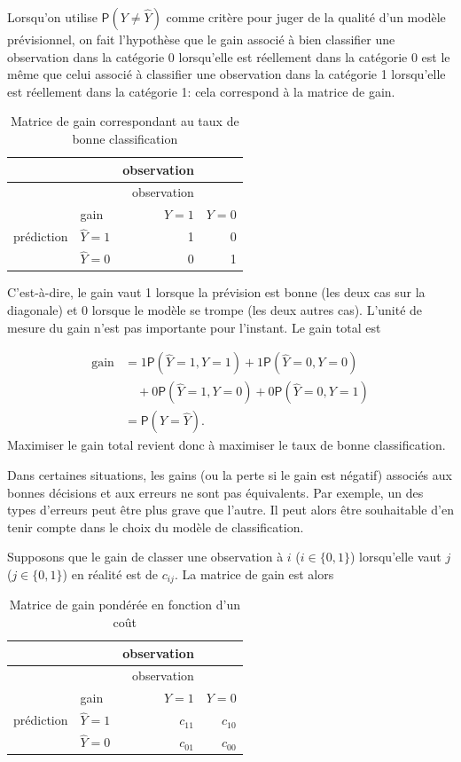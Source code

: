 \documentclass[
  11pt,
  letterpaper,
]{book}
\theoremstyle{definition}
\theoremstyle{definition}
\theoremstyle{definition}
\theoremstyle{remark}
\begin{document}
Lorsqu'on utilise \({\mathsf P}\left(Y \neq \widehat{Y}\right)\) comme critère pour juger de la qualité d'un modèle prévisionnel, on fait l'hypothèse que le gain associé à bien classifier une observation dans la catégorie 0 lorsqu'elle est réellement dans la catégorie 0 est le même que celui associé à classifier une observation dans la catégorie 1 lorsqu'elle est réellement dans la catégorie 1: cela correspond à la matrice de gain.

\begin{longtable}[]{@{}llrr@{}}
\caption{\label{tab:03-gain1} Matrice de gain correspondant au taux de bonne classification}\tabularnewline
\toprule
& & observation & \\
\midrule
\endfirsthead
\toprule
& & observation & \\
\midrule
\endhead
& gain & \(Y=1\) & \(Y=0\) \\
prédiction & \(\widehat{Y}=1\) & 1 & 0 \\
& \(\widehat{Y}=0\) & 0 & 1 \\
\bottomrule
\end{longtable}

C'est-à-dire, le gain vaut 1 lorsque la prévision est bonne (les deux cas sur la diagonale) et 0 lorsque le modèle se trompe (les deux autres cas). L'unité de mesure du gain n'est pas importante pour l'instant. Le gain total est

\begin{align*}
\text{gain} &= 1 {\mathsf P}\left(\widehat{Y}=1, Y=1\right) + 1 {\mathsf P}\left(\widehat{Y}=0, Y=0\right) 
\\ &\quad + 0 {\mathsf P}\left(\widehat{Y}=1, Y=0\right)  + 0 {\mathsf P}\left(\widehat{Y}=0, Y=1\right)
\\& = {\mathsf P}\left(Y = \widehat{Y}\right).
\end{align*}
Maximiser le gain total revient donc à maximiser le taux de bonne classification.

Dans certaines situations, les gains (ou la perte si le gain est négatif) associés aux bonnes décisions et aux erreurs ne sont pas équivalents. Par exemple, un des types d'erreurs peut être plus grave que l'autre. Il peut alors être souhaitable d'en tenir compte dans le choix du modèle de classification.

Supposons que le gain de classer une observation à \(i\) (\(i \in \{0,1\}\)) lorsqu'elle vaut \(j\) (\(j \in \{0,1\}\)) en réalité est de \(c_{ij}\). La matrice de gain est alors

\begin{longtable}[]{@{}llrr@{}}
\caption{\label{tab:03-gain2} Matrice de gain pondérée en fonction d'un coût}\tabularnewline
\toprule
& & observation & \\
\midrule
\endfirsthead
\toprule
& & observation & \\
\midrule
\endhead
& gain & \(Y=1\) & \(Y=0\) \\
prédiction & \(\widehat{Y}=1\) & \(c_{11}\) & \(c_{10}\) \\
& \(\widehat{Y}=0\) & \(c_{01}\) & \(c_{00}\) \\
\bottomrule
\end{longtable}
\end{document}
